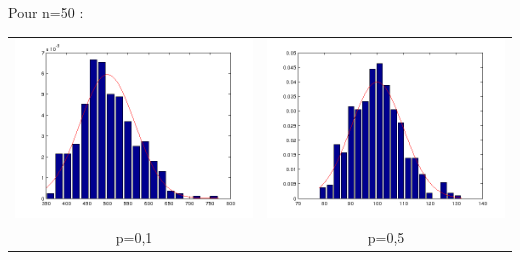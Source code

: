 \documentclass{article}
\begin{document}
Pour n=50 : \\
\begin{tabular}{c c}
	\includegraphics[scale=0.5]{graph/n50p1.png} & 
	\includegraphics[scale=0.5]{graph/n50p5.png} \\
	p=0,1 &	p=0,5
\end{tabular}\\
\end{document}
